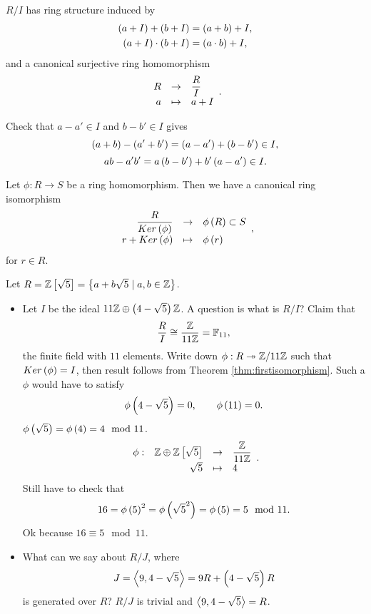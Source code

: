 \begin{proposition}
$ R / I $ has ring structure induced by
\begin{align*}
\left( a + I \right) + \left( b + I \right) & = \left( a + b \right) + I, \\
\left( a + I \right) \cdot \left( b + I \right) & = \left( a \cdot b \right) + I,
\end{align*}
and a canonical surjective ring homomorphism
$$ \function{R}{\dfrac{R}{I}}{a}{a + I}. $$
\end{proposition}

Check that $ a - a' \in I $ and $ b - b' \in I $ gives
$$ \left( a + b \right) - \left( a' + b' \right) = \left( a - a' \right) + \left( b - b' \right) \in I, $$
$$ ab - a'b' = a\left( b - b' \right) + b'\left( a - a' \right) \in I. $$

\begin{theorem}
\label{thm:firstisomorphism}
Let $ \phi : R \to S $ be a ring homomorphism. Then we have a canonical ring isomorphism
$$ \function{\dfrac{R}{Ker\rb{\phi}}}{\phi\rb{R} \subset S}{r + Ker\rb{\phi}}{\phi\rb{r}}, $$
for $ r \in R $.
\end{theorem}

\begin{example*}
Let $ R = \mathbb{Z}\left[ \sqrt{5} \right] = \left\{ a + b\sqrt{5} \mid a, b \in \mathbb{Z} \right\} $.
\begin{itemize}
\item Let $ I $ be the ideal $ 11\mathbb{Z} \oplus \left( 4 - \sqrt{5} \right)\mathbb{Z} $. A question is what is $ R / I $? Claim that
$$ \dfrac{R}{I} \cong \dfrac{\mathbb{Z}}{11\mathbb{Z}} = \mathbb{F}_{11}, $$
the finite field with $ 11 $ elements. Write down $ \phi : R \twoheadrightarrow \mathbb{Z} / 11\mathbb{Z} $ such that $ Ker\left( \phi \right) = I $, then result follows from Theorem \ref{thm:firstisomorphism}. Such a $ \phi $ would have to satisfy
$$ \phi\left( 4 - \sqrt{5} \right) = 0, \qquad \phi\left( 11 \right) = 0. $$
$ \phi\left( \sqrt{5} \right) = \phi\left( 4 \right) = 4 \mod 11 $.
$$ \function[\phi]{\Z \oplus \Z\sb{\sqrt{5}}}{\dfrac{\Z}{11\Z}}{\sqrt{5}}{4}. $$
Still have to check that
$$ 16 = \phi\left( 5 \right)^2 = \phi\left( \sqrt{5}^2 \right) = \phi\left( 5 \right) = 5 \mod 11. $$
Ok because $ 16 \equiv 5 \mod 11 $.
\item What can we say about $ R / J $, where
$$ J = \left\langle 9, 4 - \sqrt{5} \right\rangle = 9R + \left( 4 - \sqrt{5} \right)R $$
is generated over $ R $? $ R / J $ is trivial and $ \left\langle 9, 4 - \sqrt{5} \right\rangle = R $.
\end{itemize}
\end{example*}

